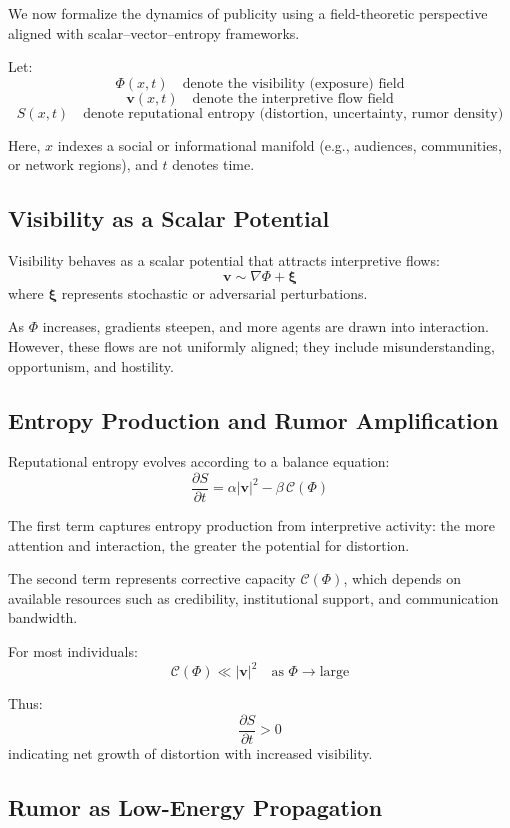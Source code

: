 \documentclass[12pt,a4paper]{article}
\begin{document}
We now formalize the dynamics of publicity using a field-theoretic perspective aligned with scalar--vector--entropy frameworks.

Let:
\[
\Phi(x,t) \quad \text{denote the visibility (exposure) field}
\]
\[
\mathbf{v}(x,t) \quad \text{denote the interpretive flow field}
\]
\[
S(x,t) \quad \text{denote reputational entropy (distortion, uncertainty, rumor density)}
\]

Here, $x$ indexes a social or informational manifold (e.g., audiences, communities, or network regions), and $t$ denotes time.

\subsection{Visibility as a Scalar Potential}

Visibility behaves as a scalar potential that attracts interpretive flows:
\[
\mathbf{v} \sim \nabla \Phi + \boldsymbol{\xi}
\]
where $\boldsymbol{\xi}$ represents stochastic or adversarial perturbations.

As $\Phi$ increases, gradients steepen, and more agents are drawn into interaction. However, these flows are not uniformly aligned; they include misunderstanding, opportunism, and hostility.

\subsection{Entropy Production and Rumor Amplification}

Reputational entropy evolves according to a balance equation:
\[
\frac{\partial S}{\partial t}
=
\alpha |\mathbf{v}|^2
-
\beta \, \mathcal{C}(\Phi)
\]

The first term captures entropy production from interpretive activity: the more attention and interaction, the greater the potential for distortion.

The second term represents corrective capacity $\mathcal{C}(\Phi)$, which depends on available resources such as credibility, institutional support, and communication bandwidth.

For most individuals:
\[
\mathcal{C}(\Phi) \ll |\mathbf{v}|^2 \quad \text{as } \Phi \to \text{large}
\]

Thus:
\[
\frac{\partial S}{\partial t} > 0
\]
indicating net growth of distortion with increased visibility.

\subsection{Rumor as Low-Energy Propagation}
\end{document}
